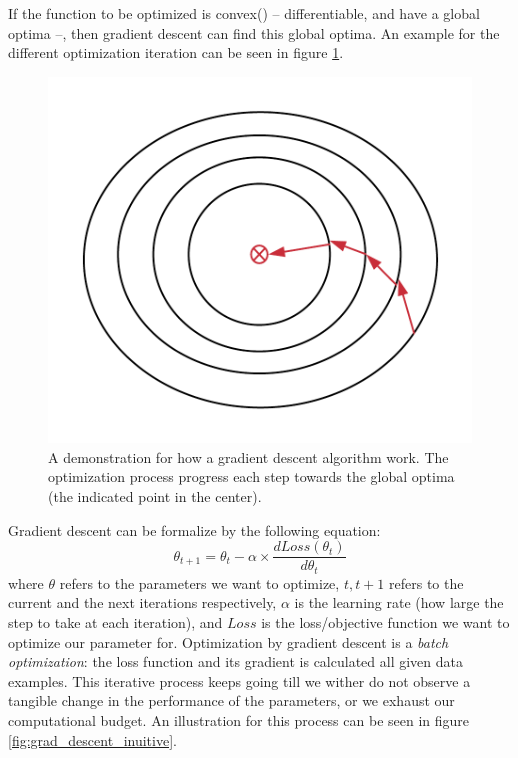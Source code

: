 \par If the function to be optimized is convex(\citep{convexfn}) -- differentiable, and have a global optima --, then gradient descent can find this global optima. An example for the different optimization iteration can be seen in figure \ref{fig:grad_descent}.

\begin{figure}
    \centering
    \includegraphics{images/gbem/grad_descent.png}
    \caption{A demonstration for how a gradient descent algorithm work. The optimization process progress each step towards the global optima (the indicated point in the center).}
    \label{fig:grad_descent}
\end{figure}

\par Gradient descent can be formalize by the following equation:
\begin{equation}
    \theta_{t+1} = \theta_{t} - \alpha \times \frac{d Loss(\theta_t)}{d\theta_t}
    \label{eq:grad_descent}
\end{equation}
where $\theta$ refers to the parameters we want to optimize, $t,t+1$ refers to the current and the next iterations respectively, $\alpha$ is the learning rate (how large the step to take at each iteration), and $Loss$ is the loss/objective function we want to optimize our parameter for. Optimization by gradient descent is a \textit{batch optimization}: the loss function and its gradient is calculated all given data examples. This iterative process keeps going till we wither do not observe a tangible change in the performance of the parameters, or we exhaust our computational budget. An illustration for this process can be seen in figure \ref{fig:grad_descent_inuitive}.

